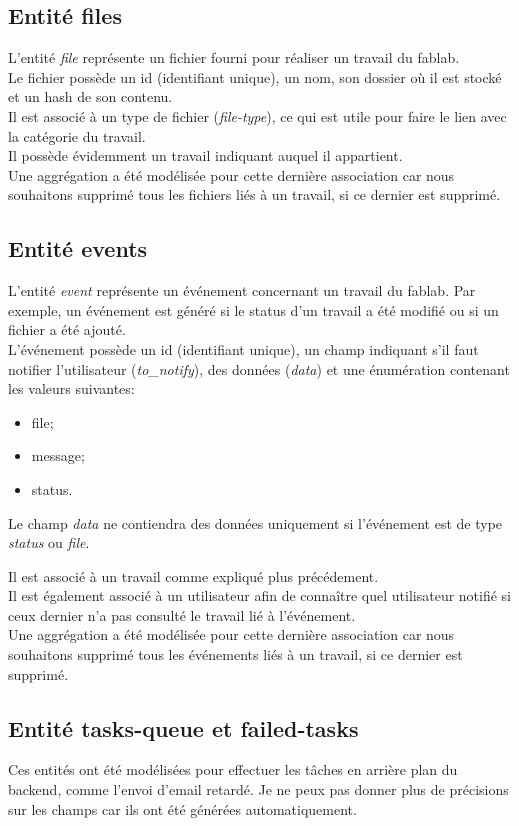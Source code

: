 \documentclass[
    iai, %
    il, %
]{heig-tb}
\begin{document}
\subsection{Entité files}
L'entité \emph{file} représente un fichier fourni pour réaliser un travail du \Gls{fablab}.\\
Le fichier possède un id (identifiant unique), un nom, son dossier où il est stocké et un hash de son contenu.\\
Il est associé à un type de fichier (\emph{file-type}), ce qui est utile pour faire le lien avec la catégorie du travail.\\
Il possède évidemment un travail indiquant auquel il appartient.\\
Une aggrégation a été modélisée pour cette dernière association car nous souhaitons supprimé tous les fichiers liés à un travail, si ce dernier est supprimé.

\subsection{Entité events}
L'entité \emph{event} représente un événement concernant un travail du \Gls{fablab}. Par exemple, un événement est généré si le status d'un travail a été modifié ou si un fichier a été ajouté. \\
L'événement possède un id (identifiant unique), un champ indiquant s'il faut notifier l'utilisateur (\emph{to\_notify}), des données (\emph{data}) et une énumération contenant les valeurs suivantes:

\begin{itemize}
    \item file;
    \item message;
    \item status.
\end{itemize}

Le champ \emph{data} ne contiendra des données uniquement si l'événement est de type \emph{status} ou \emph{file}.

Il est associé à un travail comme expliqué plus précédement.\\
Il est également associé à un utilisateur afin de connaître quel utilisateur notifié si ceux dernier n'a pas consulté le travail lié à l'événement.\\
Une aggrégation a été modélisée pour cette dernière association car nous souhaitons supprimé tous les événements liés à un travail, si ce dernier est supprimé.

\subsection{Entité tasks-queue et failed-tasks}
Ces entités ont été modélisées pour effectuer les tâches en arrière plan du \Gls{backend}, comme l'envoi d'email retardé. Je ne peux pas donner plus de précisions sur les champs car ils ont été générées automatiquement.
\end{document}
